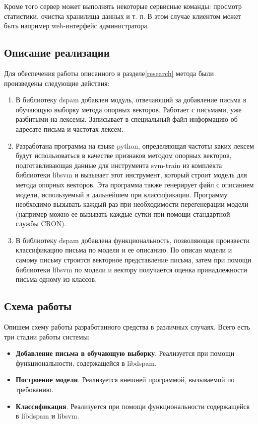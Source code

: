 Кроме того сервер может выполнять некоторые сервисные команды: просмотр статистики, очистка хранилища данных и т. п. В этом случае клиентом может быть например web-интерфейс администратора.


\subsection{Описание реализации}
	Для обеспечения работы описанного в разделе\ref{research} метода были произведены следующие действия:
\begin{enumerate}
\item В библиотеку dspam добавлен модуль, отвечающий за добавление письма в обучающую выборку метода опорных векторов. Работает с письмами, уже разбитыми на лексемы. Записывает в специальный файл информацию об адресате письма и частотах лексем.
\item Разработана программа на языке python, определяющая частоты каких лексем будут использоваться в качестве признаков методом опорных векторов, подготавливающая данные для инструмента svm-train из комплекта библиотеки libsvm и вызывает этот инструмент, который строит модель для метода опорных векторов. Эта программа также генерирует файл с описанием модели, используемый в дальнейшем при классификации. Программу необходимо вызывать каждый раз при необходимости перегенерации модели (например можно ее вызывать каждые сутки при помощи стандартной службы CRON).  
\item В библиотеку dspam добавлена функциональность, позволяющая произвести классификацию письма по модели и ее описанию. По описан модели и самому письму строится векторное представление письма, затем при помощи библиотеки libsvm по модели и вектору получается оценка принадлежности письма одному из классов.
\end{enumerate}

\subsection{Схема работы}
Опишем схему работы разработанного средства в различных случаях.
Всего есть три стадии работы системы:
\begin{itemize}
\item \textbf{Добавление письма в обучающую выборку}. Реализуется при помощи функциональности, содержащейся в libdspam.
\item \textbf{Построение модели}. Реализуется внешней программой, вызываемой по требованию.
\item \textbf{Классификация}. Реализуется при помощи функциональности содержащейся в libdspam и libsvm.
\end{itemize}


